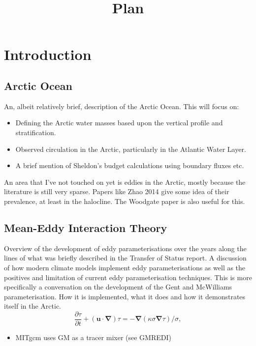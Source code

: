 \documentclass[10pt,a4paper]{article}
\title{Plan}
\begin{document}
\maketitle


\section{Introduction}

\subsection{Arctic Ocean}

An, albeit relatively brief, description of the Arctic Ocean. This will focus on:
\begin{itemize}
\item Defining the Arctic water masses based upon the vertical profile and stratification.
\item Observed circulation in the Arctic, particularly in the Atlantic Water Layer.
\item A brief mention of  Sheldon's budget calculations using boundary fluxes etc.
\end{itemize}

An area that I've not touched on yet is eddies in the Arctic, mostly because the literature
is still very sparse. Papers like Zhao 2014 give some idea of their prevalence, at least in the
halocline. The Woodgate paper is also useful for this.

\subsection{Mean-Eddy Interaction Theory}

Overview of the development of eddy parameterisations over the years along
the lines of what was briefly described in the Transfer of Status report. 
A discussion of how
modern climate models implement eddy parameterisations
as well as the positives and limitation of current 
eddy parameterisation techniques. 
This is more specifically a conversation on the development
of the Gent and McWilliams parameterisation. 
How it is implemented, what it does and how it demonstrates itself in the Arctic.
\begin{equation}
  \frac{\partial\tau}{\partial t} + (\boldsymbol{u}\cdot\boldsymbol{\nabla})\tau  = -\boldsymbol{\nabla}(\kappa\sigma
  \boldsymbol{\nabla}\tau)/\sigma,
\end{equation}
\begin{itemize}
\item MITgcm uses GM as a tracer mixer (see GMREDI)
\end{itemize}
\end{document}
